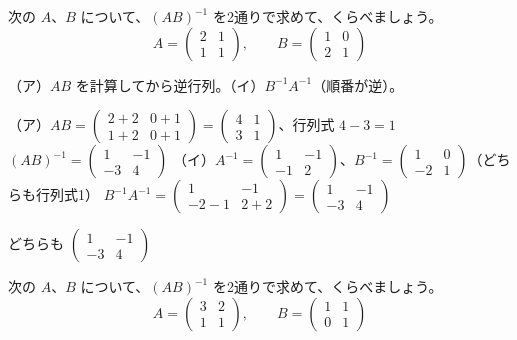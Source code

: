 \begin{reidai}[つないだ機械の逆行列]
次の $A$、$B$ について、$(AB)^{-1}$ を2通りで求めて、くらべましょう。
\[ A=\begin{pmatrix}2&1\\1&1\end{pmatrix},\qquad B=\begin{pmatrix}1&0\\2&1\end{pmatrix} \]\par
\kangaekata（ア）$AB$ を計算してから逆行列。（イ）$B^{-1}A^{-1}$（順番が逆）。\par
\shiki（ア）$AB=\begin{pmatrix}2+2&0+1\\1+2&0+1\end{pmatrix}=\begin{pmatrix}4&1\\3&1\end{pmatrix}$、行列式 $4-3=1$\kviifq
$(AB)^{-1}=\begin{pmatrix}1&-1\\-3&4\end{pmatrix}$\kviifq
（イ）$A^{-1}=\begin{pmatrix}1&-1\\-1&2\end{pmatrix}$、$B^{-1}=\begin{pmatrix}1&0\\-2&1\end{pmatrix}$（どちらも行列式1）\kviifq
$B^{-1}A^{-1}=\begin{pmatrix}1&-1\\-2-1&2+2\end{pmatrix}=\begin{pmatrix}1&-1\\-3&4\end{pmatrix}$\par
\kotae どちらも $\begin{pmatrix}1&-1\\-3&4\end{pmatrix}$
\end{reidai}

\begin{jibun}
次の $A$、$B$ について、$(AB)^{-1}$ を2通りで求めて、くらべましょう。
\[ A=\begin{pmatrix}3&2\\1&1\end{pmatrix},\qquad B=\begin{pmatrix}1&1\\0&1\end{pmatrix} \]
\end{jibun}

